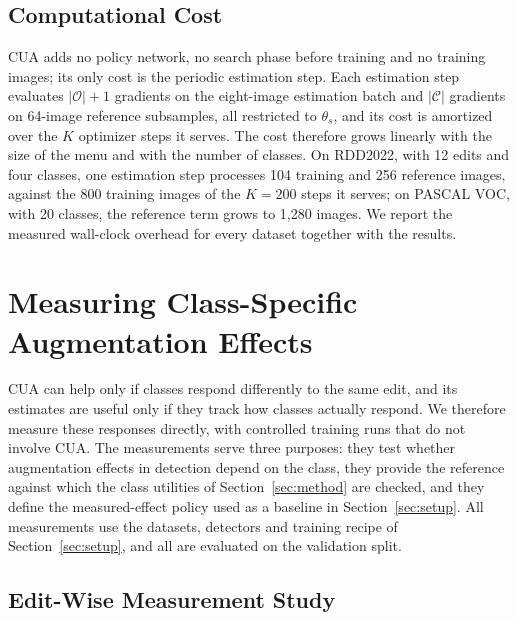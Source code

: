 \subsection{Computational Cost}
\label{sec:method_cost}

CUA adds no policy network, no search phase before training and no training images; its only cost is the periodic estimation step. Each estimation step evaluates $|\mathcal{O}|+1$ gradients on the eight-image estimation batch and $|\mathcal{C}|$ gradients on 64-image reference subsamples, all restricted to $\theta_s$, and its cost is amortized over the $K$ optimizer steps it serves. The cost therefore grows linearly with the size of the menu and with the number of classes. On RDD2022, with 12 edits and four classes, one estimation step processes 104 training and 256 reference images, against the 800 training images of the $K=200$ steps it serves; on PASCAL VOC, with 20 classes, the reference term grows to 1,280 images. We report the measured wall-clock overhead for every dataset together with the results.

\section{Measuring Class-Specific Augmentation Effects}
\label{sec:measurement}

CUA can help only if classes respond differently to the same edit, and its estimates are useful only if they track how classes actually respond. We therefore measure these responses directly, with controlled training runs that do not involve CUA. The measurements serve three purposes: they test whether augmentation effects in detection depend on the class, they provide the reference against which the class utilities of Section~\ref{sec:method} are checked, and they define the measured-effect policy used as a baseline in Section~\ref{sec:setup}. All measurements use the datasets, detectors and training recipe of Section~\ref{sec:setup}, and all are evaluated on the validation split.

\subsection{Edit-Wise Measurement Study}
\label{sec:measure_editwise}


